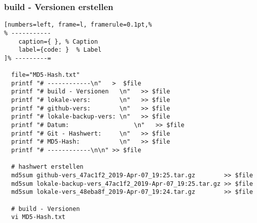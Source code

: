 \subsubsection{build - Versionen
erstellen}\label{build-versionen-erstellen-1}

\lstset{language=Bash} %
\begin{lstlisting}[numbers=left, frame=l, framerule=0.1pt,%
% -----------
	caption={ }, % Caption
	label={code: }  % Label
]% ---------=

  file="MD5-Hash.txt"
  printf "# ------------\n"   >  $file
  printf "# build - Versionen   \n"   >> $file
  printf "# lokale-vers:        \n"   >> $file
  printf "# github-vers:        \n"   >> $file
  printf "# lokale-backup-vers: \n"   >> $file
  printf "# Datum:                  \n"   >> $file
  printf "# Git - Hashwert:     \n"   >> $file
  printf "# MD5-Hash:           \n"   >> $file
  printf "# ------------\n\n" >> $file

  # hashwert erstellen
  md5sum github-vers_47ac1f2_2019-Apr-07_19:25.tar.gz        >> $file
  md5sum lokale-backup-vers_47ac1f2_2019-Apr-07_19:25.tar.gz >> $file
  md5sum lokale-vers_48eba8f_2019-Apr-07_19:24.tar.gz        >> $file

  # build - Versionen
  vi MD5-Hash.txt
\end{lstlisting}
